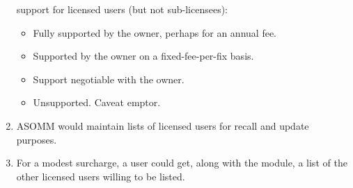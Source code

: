 \documentclass[12pt,final]{article}
\begin{document}
\begin{enumerate}
        support for licensed users (but not sub-licensees):
\begin{itemize}
        \item Fully supported by the owner, perhaps for an annual fee.
        \item Supported by the owner on a fixed-fee-per-fix basis.
        \item Support negotiable with the owner.
        \item Unsupported. Caveat emptor.
\end{itemize}
    \item ASOMM would maintain lists of licensed users for recall and update
        purposes.
    \item For a modest surcharge, a user could get, along with the module, a
        list of the other licensed users willing to be listed.
\end{enumerate}
\end{document}
